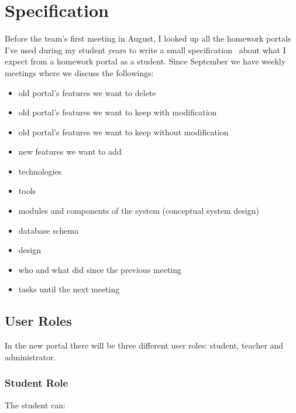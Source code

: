 \chapter{Specification}

Before the team's first meeting in August, I looked up all the homework portals I've used during my student years to write a small specification~\cite{Szepes-specification} about what I expect from a homework portal as a student. Since September we have weekly meetings where we discuss the followings: 

\begin{itemize}
	\item old portal's features we want to delete
	\item old portal's features we want to keep with modification
	\item old portal's features we want to keep without modification
	\item new features we want to add
	\item technologies
	\item tools
	\item modules and components of the system (conceptual system design)
	\item database schema
	\item design
	\item who and what did since the previous meeting
	\item tasks until the next meeting
\end{itemize}

\section{User Roles}

In the new portal there will be three different user roles: student, teacher and administrator. 

\subsection{Student Role}

The student can:


